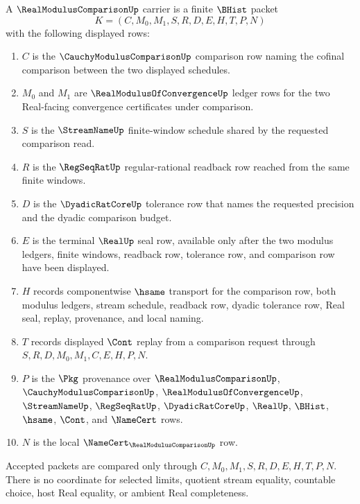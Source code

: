 \begin{definition}
\label{def:real-modulus-comparison-carrier}
A $\RealModulusComparisonUp$ carrier is a finite $\BHist$ packet
$$
K=(C,M_0,M_1,S,R,D,E,H,T,P,N)
$$
with the following displayed rows:
\begin{enumerate}
\item $C$ is the $\CauchyModulusComparisonUp$ comparison row naming the cofinal comparison between the two displayed schedules.
\item $M_0$ and $M_1$ are $\RealModulusOfConvergenceUp$ ledger rows for the two Real-facing convergence certificates under comparison.
\item $S$ is the $\StreamNameUp$ finite-window schedule shared by the requested comparison read.
\item $R$ is the $\RegSeqRatUp$ regular-rational readback row reached from the same finite windows.
\item $D$ is the $\DyadicRatCoreUp$ tolerance row that names the requested precision and the dyadic comparison budget.
\item $E$ is the terminal $\RealUp$ seal row, available only after the two modulus ledgers, finite windows, readback row, tolerance row, and comparison row have been displayed.
\item $H$ records componentwise $\hsame$ transport for the comparison row, both modulus ledgers, stream schedule, readback row, dyadic tolerance row, Real seal, replay, provenance, and local naming.
\item $T$ records displayed $\Cont$ replay from a comparison request through $S,R,D,M_0,M_1,C,E,H,P,N$.
\item $P$ is the $\Pkg$ provenance over $\RealModulusComparisonUp$, $\CauchyModulusComparisonUp$, $\RealModulusOfConvergenceUp$, $\StreamNameUp$, $\RegSeqRatUp$, $\DyadicRatCoreUp$, $\RealUp$, $\BHist$, $\hsame$, $\Cont$, and $\NameCert$ rows.
\item $N$ is the local $\NameCert_{\RealModulusComparisonUp}$ row.
\end{enumerate}
Accepted packets are compared only through $C,M_0,M_1,S,R,D,E,H,T,P,N$. There is no coordinate for selected limits, quotient stream equality, countable choice, host Real equality, or ambient Real completeness.
\end{definition}

